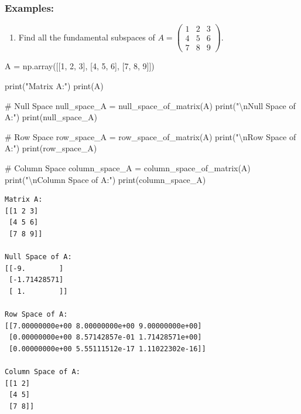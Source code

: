 \documentclass[
  letterpaper,
  DIV=11,
  numbers=noendperiod]{scrreprt}
\newenvironment{Shaded}{\begin{snugshade}}{\end{snugshade}}
\newcommand{\BuiltInTok}[1]{\textcolor[rgb]{0.00,0.23,0.31}{#1}}
\newcommand{\CharTok}[1]{\textcolor[rgb]{0.13,0.47,0.30}{#1}}
\newcommand{\CommentTok}[1]{\textcolor[rgb]{0.37,0.37,0.37}{#1}}
\newcommand{\DecValTok}[1]{\textcolor[rgb]{0.68,0.00,0.00}{#1}}
\newcommand{\NormalTok}[1]{\textcolor[rgb]{0.00,0.23,0.31}{#1}}
\newcommand{\OperatorTok}[1]{\textcolor[rgb]{0.37,0.37,0.37}{#1}}
\newcommand{\StringTok}[1]{\textcolor[rgb]{0.13,0.47,0.30}{#1}}
\providecommand{\tightlist}{%
  \setlength{\itemsep}{0pt}\setlength{\parskip}{0pt}}\usepackage{longtable,booktabs,array}
\theoremstyle{plain}
\theoremstyle{definition}
\theoremstyle{remark}
\begin{document}
\subsubsection{Examples:}\label{examples}

\begin{enumerate}
\def\labelenumi{\arabic{enumi}.}
\tightlist
\item
  Find all the fundamental subspaces of
  \(A=\begin{pmatrix}1&2&3\\ 4&5&6\\7&8&9\end{pmatrix}\).
\end{enumerate}

\begin{Shaded}
\begin{Highlighting}[]
\NormalTok{A }\OperatorTok{=}\NormalTok{ np.array([[}\DecValTok{1}\NormalTok{, }\DecValTok{2}\NormalTok{, }\DecValTok{3}\NormalTok{],}
\NormalTok{              [}\DecValTok{4}\NormalTok{, }\DecValTok{5}\NormalTok{, }\DecValTok{6}\NormalTok{],}
\NormalTok{              [}\DecValTok{7}\NormalTok{, }\DecValTok{8}\NormalTok{, }\DecValTok{9}\NormalTok{]])}

\BuiltInTok{print}\NormalTok{(}\StringTok{"Matrix A:"}\NormalTok{)}
\BuiltInTok{print}\NormalTok{(A)}

\CommentTok{\# Null Space}
\NormalTok{null\_space\_A }\OperatorTok{=}\NormalTok{ null\_space\_of\_matrix(A)}
\BuiltInTok{print}\NormalTok{(}\StringTok{"}\CharTok{\textbackslash{}n}\StringTok{Null Space of A:"}\NormalTok{)}
\BuiltInTok{print}\NormalTok{(null\_space\_A)}

\CommentTok{\# Row Space}
\NormalTok{row\_space\_A }\OperatorTok{=}\NormalTok{ row\_space\_of\_matrix(A)}
\BuiltInTok{print}\NormalTok{(}\StringTok{"}\CharTok{\textbackslash{}n}\StringTok{Row Space of A:"}\NormalTok{)}
\BuiltInTok{print}\NormalTok{(row\_space\_A)}

\CommentTok{\# Column Space}
\NormalTok{column\_space\_A }\OperatorTok{=}\NormalTok{ column\_space\_of\_matrix(A)}
\BuiltInTok{print}\NormalTok{(}\StringTok{"}\CharTok{\textbackslash{}n}\StringTok{Column Space of A:"}\NormalTok{)}
\BuiltInTok{print}\NormalTok{(column\_space\_A)}
\end{Highlighting}
\end{Shaded}

\begin{verbatim}
Matrix A:
[[1 2 3]
 [4 5 6]
 [7 8 9]]

Null Space of A:
[[-9.        ]
 [-1.71428571]
 [ 1.        ]]

Row Space of A:
[[7.00000000e+00 8.00000000e+00 9.00000000e+00]
 [0.00000000e+00 8.57142857e-01 1.71428571e+00]
 [0.00000000e+00 5.55111512e-17 1.11022302e-16]]

Column Space of A:
[[1 2]
 [4 5]
 [7 8]]
\end{verbatim}
\end{document}
